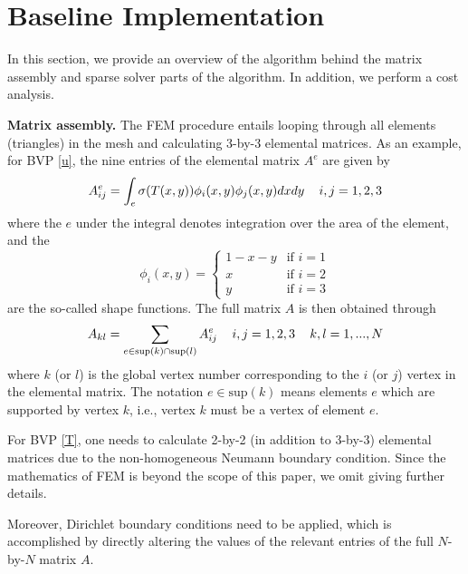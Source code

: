 \documentclass[letterpaper]{article}
\newcommand{\mypar}[1]{{\bf #1.}}
\begin{document}
\section{Baseline Implementation}\label{sec:baseline}

In this section, we provide an overview of the algorithm behind the matrix assembly and sparse solver parts of the algorithm. In addition, we perform a cost analysis.

\mypar{Matrix assembly}
The FEM procedure entails looping through all elements (triangles) in the mesh and calculating 3-by-3 elemental matrices. As an example, for BVP \eqref{u}, the nine entries of the elemental matrix $A^e$ are given by
\begin{equation*}
A_{ij}^e = \int_e \sigma(T(x,y)) \phi_i(x,y) \phi_j(x,y) dxdy \text{ \, \ } i,j=1,2,3 
\end{equation*}
where the $e$ under the integral denotes integration over the area of the element, and the
\begin{equation*}
\phi_i(x,y) = \left\{ \begin{array}{ll} 
				1-x-y & \textrm{if $i=1$} \\ 
				x     & \textrm{if $i=2$}   \\
				y     & \textrm{if $i=3$}
				\end{array} \right. 
\end{equation*}
are the so-called shape functions.
The full matrix $A$ is then obtained through
\begin{equation*}
A_{kl} = \sum_{e \in \text{sup}(k) \cap \text{sup}(l)} A_{ij}^e 
\text{ \, \ } i,j=1,2,3 \text{ \, \ } k,l=1,...,N
\end{equation*}
where $k$ (or $l$) is the global vertex number corresponding to the $i$ (or $j$) vertex in the elemental matrix. The notation $e \in \text{sup}(k)$ means elements $e$ which are supported by vertex $k$, i.e., vertex $k$ must be a vertex of element $e$.

For BVP \eqref{T}, one needs to calculate 2-by-2 (in addition to 3-by-3) elemental matrices due to the non-homogeneous Neumann boundary condition. Since the mathematics of FEM is beyond the scope of this paper, we omit giving further details.

Moreover, Dirichlet boundary conditions need to be applied, which is accomplished by directly altering the values of the relevant entries of the full $N$-by-$N$ matrix $A$.
\end{document}
